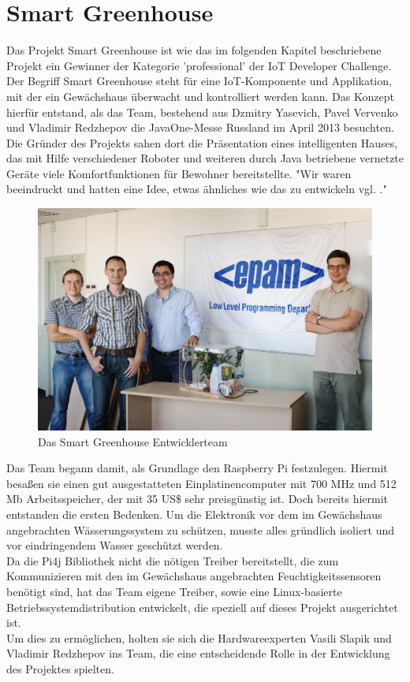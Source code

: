 \section{Smart Greenhouse}\label{s:SmartGreenhouse}

Das Projekt Smart Greenhouse ist wie das im folgenden Kapitel  beschriebene Projekt ein Gewinner der Kategorie 'professional' der IoT Developer Challenge. 
Der Begriff Smart Greenhouse steht für eine \ac{IoT}-Komponente und Applikation, mit der ein Gewächshaus überwacht und kontrolliert werden kann. Das Konzept hierfür entstand, als das Team, bestehend aus Dzmitry Yasevich, Pavel Vervenko und Vladimir Redzhepov die JavaOne-Messe Russland im April 2013 besuchten. Die Gründer des Projekts sahen dort die Präsentation eines intelligenten Hauses, das mit Hilfe verschiedener Roboter und weiteren durch Java betriebene vernetzte Geräte viele Komfortfunktionen für Bewohner bereitstellte. "Wir waren beeindruckt und hatten eine Idee, etwas ähnliches wie das zu entwickeln vgl. \cite{z:smartgreenhouse}."

\begin{figure}[H] 
	\centering
	\includegraphics[scale=0.1]{Bilder/smartgreenhouse}
	\caption{Das Smart Greenhouse Entwicklerteam\cite{i:smartgreenhouse}}
	\label{f:smartgreenhouse}
\end{figure}

Das Team begann damit, als Grundlage den Raspberry Pi festzulegen. Hiermit besaßen sie einen gut ausgestatteten Einplatinencomputer mit 700 \ac{MHz} und 512 Mb Arbeitsspeicher, der mit 35 US\$ sehr preisgünstig ist. Doch bereits hiermit entstanden die ersten Bedenken. Um die Elektronik vor dem im Gewächshaus angebrachten Wässerungssystem zu schützen, musste alles gründlich isoliert und vor eindringendem Wasser geschützt werden.\\
Da die Pi4j Bibliothek nicht die nötigen Treiber bereitstellt, die zum Kommunizieren mit den im Gewächshaus angebrachten Feuchtigkeitssensoren benötigt sind, hat das Team eigene Treiber, sowie eine Linux-basierte Betriebssystemdistribution entwickelt, die speziell auf dieses Projekt ausgerichtet ist.\\
Um dies zu ermöglichen, holten sie sich die Hardwareexperten Vasili Slapik und Vladimir Redzhepov ins Team, die eine entscheidende Rolle in der Entwicklung des Projektes spielten.

